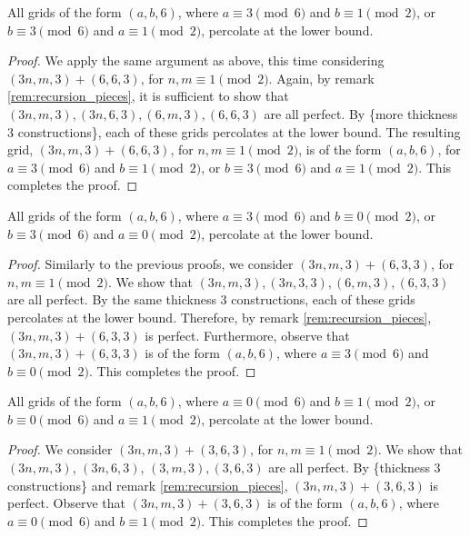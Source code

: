 \begin{lem}
\label{lem:thickness_6_case_2}
All grids of the form $(a,b,6)$, where $a \equiv 3 \pmod 6$ and $b \equiv 1 \pmod 2$, or $b \equiv 3 \pmod 6$ and $a \equiv 1 \pmod 2$, percolate at the lower bound.
\end{lem}

\begin{proof}
We apply the same argument as above, this time considering $(3n,m,3) + (6,6,3)$, for $n,m \equiv 1 \pmod 2$. Again, by remark \ref{rem:recursion_pieces}, it is sufficient to show that $(3n,m,3), (3n,6,3), (6,m,3), (6,6,3)$ are all perfect. By \{more thickness 3 constructions\}, each of these grids percolates at the lower bound. The resulting grid, $(3n,m,3) + (6,6,3)$, for $n,m \equiv 1 \pmod 2$, is of the form $(a,b,6)$, for $a \equiv 3 \pmod 6$ and $b \equiv 1 \pmod 2$, or $b \equiv 3 \pmod 6$ and $a \equiv 1 \pmod 2$. This completes the proof.
\end{proof}

\begin{lem}
\label{lem:thickness_6_case_3}
All grids of the form $(a,b,6)$, where $a \equiv 3 \pmod 6$ and $b \equiv 0 \pmod 2$, or $b \equiv 3 \pmod 6$ and $a \equiv 0 \pmod 2$, percolate at the lower bound.
\end{lem}

\begin{proof}
Similarly to the previous proofs, we consider $(3n,m,3) + (6,3,3)$, for $n,m \equiv 1 \pmod 2$. We show that $(3n,m,3), (3n,3,3), (6,m,3), (6,3,3)$ are all perfect. By the same thickness 3 constructions, each of these grids percolates at the lower bound. Therefore, by remark \ref{rem:recursion_pieces}, $(3n,m,3) + (6,3,3)$ is perfect. Furthermore, observe that $(3n,m,3) + (6,3,3)$ is of the form $(a,b,6)$, where $a \equiv 3 \pmod 6$ and $b \equiv 0 \pmod 2$. This completes the proof.
\end{proof}

\begin{lem}
\label{lem:thickness_6_case_4}
All grids of the form $(a,b,6)$, where $a \equiv 0 \pmod 6$ and $b \equiv 1 \pmod 2$, or $b \equiv 0 \pmod 6$ and $a \equiv 1 \pmod 2$, percolate at the lower bound.
\end{lem}

\begin{proof}
We consider $(3n,m,3) + (3,6,3)$, for $n,m \equiv 1 \pmod 2$. We show that $(3n,m,3)$, $(3n,6,3)$, $(3,m,3), (3,6,3)$ are all perfect. By \{thickness 3 constructions\} and remark \ref{rem:recursion_pieces}, $(3n,m,3) + (3,6,3)$ is perfect. Observe that $(3n,m,3) + (3,6,3)$ is of the form $(a,b,6)$, where $a \equiv 0 \pmod 6$ and $b \equiv 1 \pmod 2$. This completes the proof.
\end{proof}

